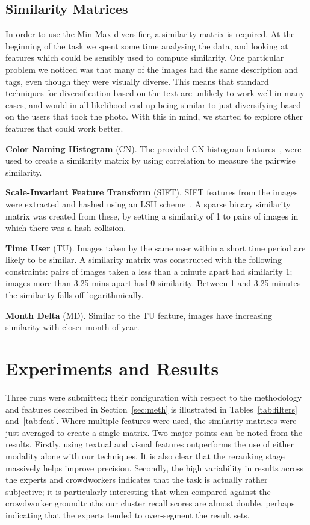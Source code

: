 \documentclass{../acm_proc_article-me11_tweaked}
\begin{document}
\subsection{Similarity Matrices}
In order to use the Min-Max diversifier, a similarity matrix is required. At the beginning of the task we spent some time analysing the data, and looking at features which could be sensibly used  to compute similarity. One particular problem we noticed was that many of the images had the same description and tags, even though they were visually diverse. %
This means that standard techniques for diversification based on the text are unlikely to work well in many cases, and would in all likelihood end up being similar to just diversifying based on the users that took the photo. With this in mind, we started to explore other features that could work better. 

\noindent \textbf{Color Naming Histogram} (CN). The provided CN histogram features~\cite{DIV2013}, were used to create a similarity matrix by using correlation to measure the pairwise similarity.

\noindent \textbf{Scale-Invariant Feature Transform} (SIFT). SIFT features from the images were extracted and hashed using an LSH scheme~\cite{Hare:2013:TVP:2461466.2461514}. A sparse binary similarity matrix was created from these, by setting a similarity of 1 to pairs of images in which there was a hash collision.

\noindent \textbf{Time User} (TU). Images taken by the same user within a short time period are likely to be similar. A similarity matrix was constructed with the following constraints: pairs of images taken a less than a minute apart had similarity 1; images more than 3.25 mins apart had 0 similarity. Between 1 and 3.25 minutes the similarity falls off logarithmically.

\noindent \textbf{Month Delta} (MD). Similar to the TU feature, images have increasing similarity with closer month of year.

\section{Experiments and Results}\label{sec:exp}
Three runs were submitted; their configuration with respect to the methodology and features described in Section~\ref{sec:meth} is illustrated in Tables~\ref{tab:filters} and~\ref{tab:feat}. Where multiple features were used, the similarity matrices were just averaged to create a single matrix. Two major points can be noted from the results. Firstly, using textual and visual features outperforms the use of either modality alone with our techniques. It is also clear that the reranking stage massively helps improve precision. Secondly, the high variability in results across the experts and crowdworkers indicates that the task is actually rather subjective; it is particularly interesting that when compared against the crowdworker groundtruths our cluster recall scores are almost double, perhaps indicating that the experts tended to over-segment the result sets.
\end{document}
